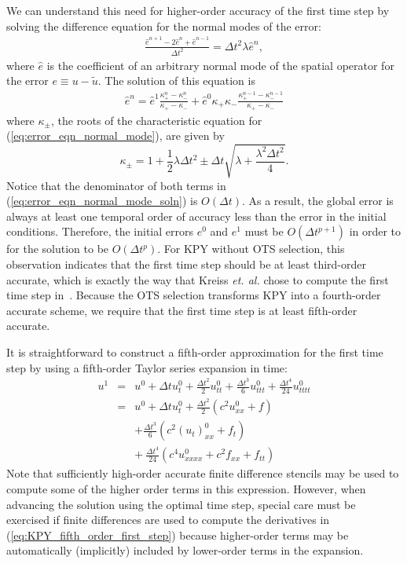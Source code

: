 \documentclass[twocolumn]{article} %
\newcommand{\beq}{\begin{equation}}
\newcommand{\eeq}{\end{equation}}
\newcommand{\bea}{\begin{eqnarray}}
\newcommand{\eea}{\end{eqnarray}}
\def\etal{{\it et. al. }}
\def\tu{\tilde{u}}
\def\dt{\Delta t}
\def\he{\hat{e}}
\begin{document}
We can understand this need for higher-order accuracy of the first time step 
by solving the difference equation for the normal modes of the error:
\bea
  \frac{\he^{n+1} - 2 \he^{n} + \he^{n-1}}
       {\dt^2} = \dt^2 \lambda \he^{n}
  \label{eq:error_eqn_normal_mode},
\eea
where $\he$ is the coefficient of an arbitrary normal mode of the spatial
operator for the error $e \equiv u - \tu$.  The solution of this equation 
is~\cite{carrier_pearson_book}
\bea
  \he^n = \he^1 \frac{\kappa_+^n - \kappa_-^n}{\kappa_+ - \kappa_-} 
      + \he^0 \kappa_+ \kappa_- 
        \frac{\kappa_+^{n-1} - \kappa_-^{n-1}}{\kappa_+ - \kappa_-} 
  \label{eq:error_eqn_normal_mode_soln}
\eea
where $\kappa_\pm$, the roots of the characteristic equation for 
(\ref{eq:error_eqn_normal_mode}), are given by~\cite{kreiss2002}
\beq
  \kappa_\pm = 1 + \frac{1}{2} \lambda \dt^2 
             \pm \dt \sqrt{\lambda + \frac{\lambda^2 \dt^2}{4}}.
\eeq
Notice that the denominator of both terms in 
(\ref{eq:error_eqn_normal_mode_soln}) is $O(\dt)$.  As a result, the 
global error is always at least one temporal order of accuracy less than the 
error in the initial conditions.  Therefore, the initial errors $e^0$ and 
$e^1$ must be $O(\dt^{p+1})$ in order to for the solution to be $O(\dt^p)$. 
For KPY without OTS selection, this observation indicates that the first
time step should be at least third-order accurate, which is exactly the way
that Kreiss \etal chose to compute the first time step in~\cite{kreiss2002}.
Because the OTS selection transforms KPY into a fourth-order accurate scheme, 
we require that the first time step is at least fifth-order accurate.

It is straightforward to construct a fifth-order approximation for the first 
time step by using a fifth-order Taylor series expansion in time:
\bea
  u^1 &=& u^0 + \dt u_t^0 + \frac{\dt^2}{2} u_{tt}^0
      + \frac{\dt^3}{6} u_{ttt}^0 
   + \frac{\dt^4}{24} u_{tttt}^0
  \nonumber \\
  &=& u^0 + \dt u_t^0 + \frac{\dt^2}{2} \left(c^2 u_{xx}^0 + f\right)
  \nonumber \\
  & & + \frac{\dt^3}{6} \left(c^2 \left(u_t\right)_{xx}^0 + f_t\right)
  \nonumber \\
  & & + \ \frac{\dt^4}{24} \left(c^4 u_{xxxx}^0 + c^2 f_{xx} + f_{tt}\right)
  \label{eq:KPY_fifth_order_first_step}
\eea
Note that sufficiently high-order accurate finite difference stencils may be 
used to compute some of the higher order terms in this expression.  However,
when advancing the solution using the optimal time step, special care must be 
exercised if finite differences are used to compute the derivatives in 
(\ref{eq:KPY_fifth_order_first_step}) because higher-order terms may be 
automatically (implicitly) included by lower-order terms in the expansion.
\end{document}
